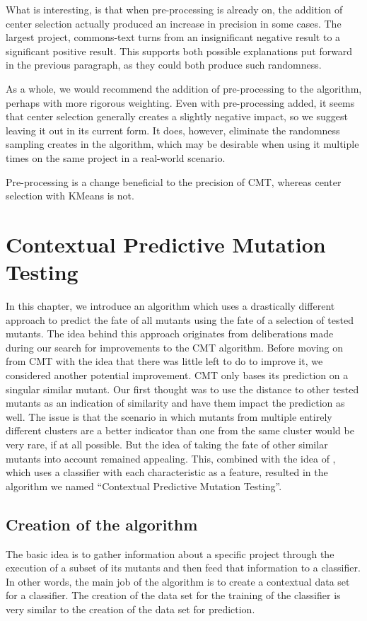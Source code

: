 \documentclass[twoside]{uva-inf-bachelor-thesis}
\begin{document}
What is interesting, is that when pre-processing is already on, the addition of center selection actually produced an increase in precision in some cases. The largest project, commons-text turns from an insignificant negative result to a significant positive result. This supports both possible explanations put forward in the previous paragraph, as they could both produce such randomness.

As a whole, we would recommend the addition of pre-processing to the algorithm, perhaps with more rigorous weighting. Even with pre-processing added, it seems that center selection generally creates a slightly negative impact, so we suggest leaving it out in its current form. It does, however, eliminate the randomness sampling creates in the algorithm, which may be desirable when using it multiple times on the same project in a real-world scenario.
\begin{hypothesis}
    Pre-processing is a change beneficial to the precision of CMT, whereas center selection with KMeans is not.
\end{hypothesis}

\chapter{Contextual Predictive Mutation Testing}
\label{chap:5}
In this chapter, we introduce an algorithm which uses a drastically different approach to predict the fate of all mutants using the fate of a selection of tested mutants. The idea behind this approach originates from deliberations made during our search for improvements to the CMT algorithm. Before moving on from CMT with the idea that there was little left to do to improve it, we considered another potential improvement. CMT only bases its prediction on a singular similar mutant. Our first thought was to use the distance to other tested mutants as an indication of similarity and have them impact the prediction as well. The issue is that the scenario in which mutants from multiple entirely different clusters are a better indicator than one from the same cluster would be very rare, if at all possible. But the idea of taking the fate of other similar mutants into account remained appealing. This, combined with the idea of \textcite{Zhang16}, which uses a classifier with each characteristic as a feature, resulted in the algorithm we named ``Contextual Predictive Mutation Testing''.

\section{Creation of the algorithm}
The basic idea is to gather information about a specific project through the execution of a subset of its mutants and then feed that information to a classifier. In other words, the main job of the algorithm is to create a contextual data set for a classifier. The creation of the data set for the training of the classifier is very similar to the creation of the data set for prediction.
\end{document}
